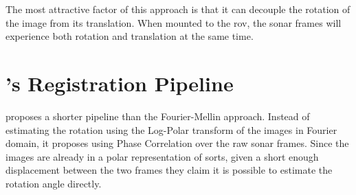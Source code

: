 The most attractive factor of this approach is that it can decouple the rotation of the image from its translation. When mounted to the \acrshort{rov}, the sonar frames will experience both rotation and translation at the same time.


\section{\citeauthor{Hurtos2015}'s Registration Pipeline \cite{Reddy1996}}

\citeauthor{Hurtos2015} proposes a shorter pipeline than the Fourier-Mellin approach. Instead of estimating the rotation using the Log-Polar transform of the images in Fourier domain, it proposes using Phase Correlation over the raw sonar frames. Since the images are already in a polar representation of sorts, given a short enough displacement between the two frames they claim it is possible to estimate the rotation angle directly.

